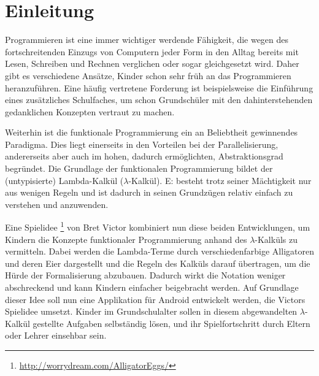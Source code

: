 \section{Einleitung}

Programmieren ist eine immer wichtiger werdende Fähigkeit, die wegen des fortschreitenden Einzugs von Computern jeder Form in den Alltag bereits mit Lesen, Schreiben und Rechnen verglichen oder sogar gleichgesetzt wird.
Daher gibt es verschiedene Ansätze, Kinder schon sehr früh an das Programmieren heranzuführen.
Eine häufig vertretene Forderung ist beispielsweise die Einführung eines zusätzliches Schulfaches, um schon Grundschüler mit den dahinterstehenden gedanklichen Konzepten vertraut zu machen.

Weiterhin ist die funktionale Programmierung ein an Beliebtheit gewinnendes Paradigma.
Dies liegt einerseits in den Vorteilen bei der Parallelisierung, andererseits aber auch im hohen, dadurch ermöglichten, Abstraktionsgrad begründet.
Die Grundlage der funktionalen Programmierung bildet der (untypisierte) Lambda-Kalkül (\(\lambda\)-Kalkül).
E: besteht trotz seiner Mächtigkeit nur aus wenigen Regeln und ist dadurch in seinen Grundzügen relativ einfach zu verstehen und anzuwenden.

Eine Spielidee \footnote{\url{http://worrydream.com/AlligatorEggs/}} von Bret Victor kombiniert nun diese beiden Entwicklungen, um Kindern die Konzepte funktionaler Programmierung anhand des \(\lambda\)-Kalküls zu vermitteln.
Dabei werden die Lambda-Terme durch verschiedenfarbige Alligatoren und deren Eier dargestellt und die Regeln des Kalküls darauf übertragen, um die Hürde der Formalisierung abzubauen.
Dadurch wirkt die Notation weniger abschreckend und kann Kindern einfacher beigebracht werden.
Auf Grundlage dieser Idee soll nun eine Applikation für Android entwickelt werden, die Victors Spielidee umsetzt.
Kinder im Grundschulalter sollen in diesem abgewandelten \(\lambda\)-Kalkül gestellte Aufgaben selbständig lösen, und ihr Spielfortschritt durch Eltern oder Lehrer einsehbar sein.
